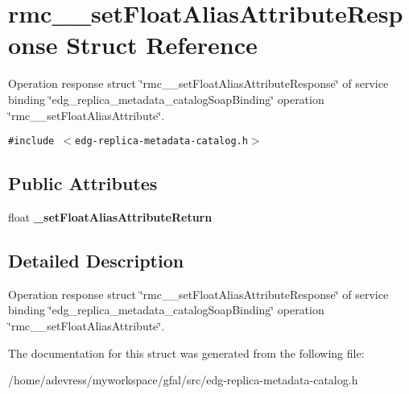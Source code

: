 \section{rmc\_\-\_\-set\-Float\-Alias\-Attribute\-Response Struct Reference}
\label{structrmc____setFloatAliasAttributeResponse}
Operation response struct \char`\"{}rmc\_\-\_\-set\-Float\-Alias\-Attribute\-Response\char`\"{} of service binding \char`\"{}edg\_\-replica\_\-metadata\_\-catalog\-Soap\-Binding\char`\"{} operation \char`\"{}rmc\_\-\_\-set\-Float\-Alias\-Attribute\char`\"{}.  


{\tt \#include $<$edg-replica-metadata-catalog.h$>$}

\subsection*{Public Attributes}
\begin{CompactItemize}
\item 
float \textbf{\_\-set\-Float\-Alias\-Attribute\-Return}\label{structrmc____setFloatAliasAttributeResponse_6eed0542f003a8063d13c327241a7126}

\end{CompactItemize}


\subsection{Detailed Description}
Operation response struct \char`\"{}rmc\_\-\_\-set\-Float\-Alias\-Attribute\-Response\char`\"{} of service binding \char`\"{}edg\_\-replica\_\-metadata\_\-catalog\-Soap\-Binding\char`\"{} operation \char`\"{}rmc\_\-\_\-set\-Float\-Alias\-Attribute\char`\"{}. 



The documentation for this struct was generated from the following file:\begin{CompactItemize}
\item 
/home/adevress/myworkspace/gfal/src/edg-replica-metadata-catalog.h\end{CompactItemize}
